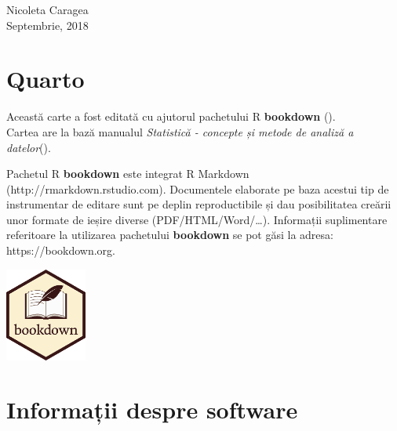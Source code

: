 \documentclass[
  11pt,
  b5paper,
  nottoc]{book}
\begin{document}
\begin{flushright}
Nicoleta Caragea \\
Septembrie, 2018
\end{flushright}

\newpage

\section*{Quarto}\label{quarto}


Această carte a fost editată cu ajutorul pachetului R \textbf{bookdown}
().\\
Cartea are la bază manualul \emph{Statistică - concepte și metode de
analiză a datelor}().

Pachetul R \textbf{bookdown} este integrat R Markdown
(http://rmarkdown.rstudio.com). Documentele elaborate pe baza acestui
tip de instrumentar de editare sunt pe deplin reproductibile și dau
posibilitatea creării unor formate de ieșire diverse
(PDF/HTML/Word/\ldots). Informații suplimentare referitoare la
utilizarea pachetului \textbf{bookdown} se pot găsi la adresa:
https://bookdown.org.

\includegraphics[width=0.2\textwidth]{images/logo.png}

\section*{Informații despre
software}\label{informaux21bii-despre-software}

\end{document}
